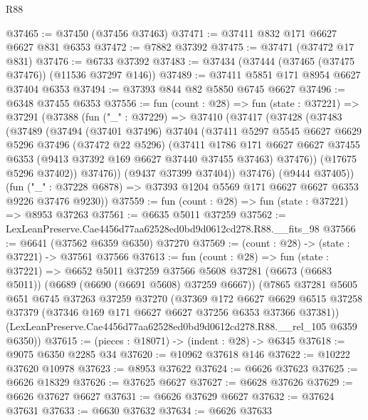 \begin{lexlean}{R88}
\begin{coremodule}
@37465 := @37450 (@37456 @37463)
@37471 := @37411 @832 @171 @6627 @6627 @831 @6353
@37472 := @7882 @37392
@37475 := @37471 (@37472 @17 @831)
@37476 := @6733 @37392
@37483 := @37434 (@37444 (@37465 (@37475 @37476)) (@11536 @37297 @146))
@37489 := @37411 @5851 @171 @8954 @6627 @37404 @6353
@37494 := @37393 @844 @82 @5850 @6745 @6627
@37496 := @6348 @37455 @6353
@37556 := fun (count : @28) =>
  fun (state : @37221) =>
  @37291
    (@37388
      (fun ("_" : @37229) =>
      @37410
        (@37417
          (@37428
            (@37483
              (@37489
                (@37494
                  (@37401 @37496)
                  @37404
                  (@37411
                    @5297
                    @5545
                    @6627
                    @6629
                    @5296
                    @37496
                    (@37472 @22 @5296)
                    (@37411
                      @1786
                      @171
                      @6627
                      @6627
                      @37455
                      @6353
                      (@9413 @37392 @169 @6627 @37440 @37455 @37463)
                      @37476))
                  (@17675 @5296 @37402))
                @37476))
            (@9437 @37399 @37404))
          @37476)
        (@9444 @37405))
      (fun ("_" : @37228 @6878) => @37393 @1204 @5569 @171 @6627 @6627 @6353 @9226 @37476 @9230))
@37559 := fun (count : @28) => fun (state : @37221) => @8953 @37263
@37561 := @6635 @5011 @37259
@37562 := LexLeanPreserve.Cae4456d77aa62528ed0bd9d0612cd278.R88.__fits_98
@37566 := @6641 (@37562 @6359 @6350) @37270
@37569 := (count : @28) -> (state : @37221) -> @37561 @37566
@37613 := fun (count : @28) =>
  fun (state : @37221) =>
  @6652
    @5011
    @37259
    @37566
    @5608
    @37281
    (@6673 (@6683 @5011))
    (@6689 (@6690 (@6691 @5608) @37259 @6667))
    (@7865
      @37281
      @5605
      @651
      @6745
      @37263
      @37259
      @37270
      (@37369
        @172
        @6627
        @6629
        @6515
        @37258
        @37379
        (@37346 @169 @171 @6627 @6627 @37256 @6353 @37366 @37381))
      (LexLeanPreserve.Cae4456d77aa62528ed0bd9d0612cd278.R88.__rel_105 @6359 @6350))
@37615 := (pieces : @18071) -> (indent : @28) -> @6345
@37618 := @9075 @6350 @2285 @34
@37620 := @10962 @37618 @146
@37622 := @10222 @37620 @10978
@37623 := @8953 @37622
@37624 := @6626 @37623
@37625 := @6626 @18329
@37626 := @37625 @6627
@37627 := @6628 @37626
@37629 := @6626 @37627 @6627
@37631 := @6626 @37629 @6627
@37632 := @37624 @37631
@37633 := @6630 @37632
@37634 := @6626 @37633

\end{coremodule}
\end{lexlean}
